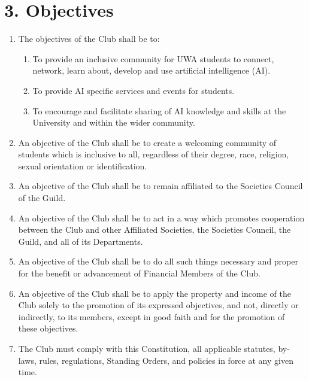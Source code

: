 \documentclass[12pt]{article}
\begin{document}
\section{3. Objectives}
\begin{enumerate}[label=3.\arabic*]
\item The objectives of the Club shall be to:
 \begin{enumerate}[label=3.1\arabic*]
    \item To provide an inclusive community for UWA students to connect, network, learn about, develop and use artificial intelligence (AI).
    \item To provide AI specific services and events for students.
    \item To encourage and facilitate sharing of AI knowledge and skills at the University and within the wider community.
 \end{enumerate}
\item An objective of the Club shall be to create a welcoming community of students which is inclusive to all, regardless of their degree, race, religion, sexual orientation or identification.
\item An objective of the Club shall be to remain affiliated to the Societies Council of the Guild.
\item An objective of the Club shall be to act in a way which promotes cooperation between the Club and other Affiliated Societies, the Societies Council, the Guild, and all of its Departments.
\item An objective of the Club shall be to do all such things necessary and proper for the benefit or advancement of Financial Members of the Club.
\item An objective of the Club shall be to apply the property and income of the Club solely to the promotion of its expressed objectives, and not, directly or indirectly, to its members, except in good faith and for the promotion of these objectives.
\item The Club must comply with this Constitution, all applicable statutes, by-laws, rules, regulations, Standing Orders, and policies in force at any given time.
\end{enumerate}
\end{document}
